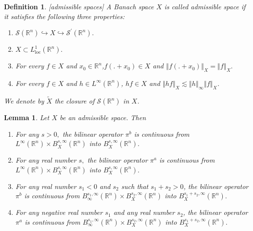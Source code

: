 \documentclass[10pt,a4paper]{amsart}
\newtheorem{definition}{Definition}
\newtheorem{lemma}{Lemma}
\begin{document}
\begin{definition}\label{reg} [admissible spaces]
A Banach space $X$ is called admissible space if it satisfies the following three
properties:
\begin{enumerate}
\item $\mathcal{S}(\mathbb{R}^{n})\hookrightarrow X\hookrightarrow \mathcal{S}^\prime(\mathbb{R}^{n})$.
\item $X\subset L^1_{\text{loc}}(%
\mathbb{R}^{n}).$
\item For every $f\in X$ and $x_0\in \mathbb{R}^{n}$,$f(.+x_0)\in X$ and $\left\Vert f(.+x_0)\right\Vert _{X}=\left\Vert  f\right\Vert _{X}.$
\item For every $f\in X$ and $h\in L^\infty(\mathbb{R}^{n})$, $hf\in X$ and $\left\Vert hf\right\Vert _{X}\lesssim\left\Vert h\right\Vert
_{\infty }\left\Vert f\right\Vert _{X}$.
\end{enumerate}
We denote by $\tilde{X}$ the  closure of $\mathcal{S}(\mathbb{R}^{n})$ in $X$.
\end{definition}

\begin{lemma}\label{para}
Let $X$ be an admissible space. Then
\begin{enumerate}
\item For any $s>0,$ the bilinear operator $\pi ^{b}$ is continuous from $%
L^{\infty }(\mathbb{R}^{n})\times B_{X}^{s,\infty }(\mathbb{R}^{n})$
into $B_{X}^{s,\infty }(\mathbb{R}^{n}).$

\item For any real number $s,$ the bilinear operator $\pi ^{a}$ is continuous
from $L^{\infty }(\mathbb{R}^{n})\times B_{X}^{s,\infty }(\mathbb{R}^{n})
$ into $B_{X}^{s,\infty }(\mathbb{R}^{n}).$

\item For any real number $s_{1}<0$ and $s_{2}$ such that $%
s_{1}+s_{2}>0$, the bilinear operator $\pi ^{b}$ is continuous from $%
B_{\infty }^{s_{1},\infty }(\mathbb{R}^{n})\times B_{X}^{s_{2},\infty }(%
\mathbb{R}^{n})$ into $B_{X}^{s_{1}+s_{2},\infty }(\mathbb{R}^{n}).$

\item For any negative real number $s_{1}$ and any real number $s_{2}$, the
bilinear operator $\pi ^{a}$ is continuous from $B_{\infty }^{s_{1},\infty }(%
\mathbb{R}^{n})\times B_{X}^{s_{2},\infty }(\mathbb{R}^{n})$ into $%
B_{X}^{s_{1}+s_{2},\infty }(\mathbb{R}^{n}).$
\end{enumerate}
\end{lemma}
\end{document}
